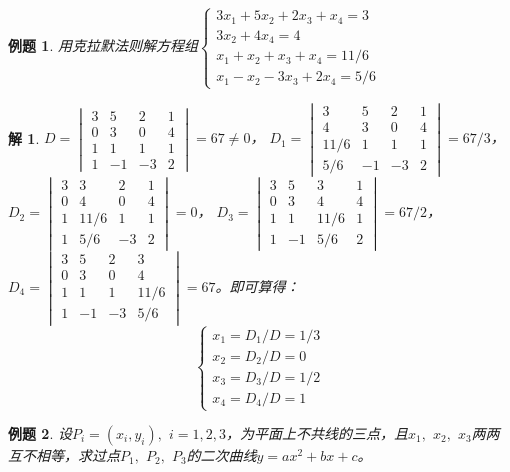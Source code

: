 \documentclass[a4paper]{book}
\newtheorem{eg}{例题}[chapter]
\newtheorem*{solution}{解}
\begin{document}
\begin{eg}
用克拉默法则解方程组$\begin{cases}
3x_1 + 5x_2 + 2x_3 + x_4 = 3 \\
3x_2 + 4x_4 = 4 \\
x_1 + x_2 + x_3 + x_4 = 11/6 \\
x_1 - x_2 - 3x_3 + 2x_4 = 5/6
\end{cases}$
\end{eg}

\begin{solution}
$D = \begin{vmatrix} 3 & 5 & 2 & 1 \\ 0 & 3 & 0 & 4 \\ 1 & 1 & 1 & 1 \\ 1 & -1 & -3 & 2 \end{vmatrix} = 67 \neq 0$，
$D_1 = \begin{vmatrix} 3 & 5 & 2 & 1 \\ 4 & 3 & 0 & 4 \\ 11/6 & 1 & 1 & 1 \\ 5/6 & -1 & -3 & 2 \end{vmatrix} = 67/3$，
$D_2 = \begin{vmatrix} 3 & 3 & 2 & 1 \\ 0 & 4 & 0 & 4 \\ 1 & 11/6 & 1 & 1 \\ 1 & 5/6 & -3 & 2 \end{vmatrix} = 0$，
$D_3 = \begin{vmatrix} 3 & 5 & 3 & 1 \\ 0 & 3 & 4 & 4 \\ 1 & 1 & 11/6 & 1 \\ 1 & -1 & 5/6 & 2 \end{vmatrix} = 67/2$，
$D_4 = \begin{vmatrix} 3 & 5 & 2 & 3 \\ 0 & 3 & 0 & 4 \\ 1 & 1 & 1 & 11/6 \\ 1 & -1 & -3 & 5/6 \end{vmatrix} =67$。即可算得：
$$
\begin{cases}
x_1 = D_1/D = 1/3 \\ x_2 = D_2/D = 0 \\ x_3 = D_3/D = 1/2 \\ x_4 = D_4/D = 1
\end{cases}$$
\end{solution}

\begin{eg}
设$P_i = (x_i ,y_i),$ $i=1, 2, 3$，为平面上不共线的三点，且$x_1,$ $x_2,$ $x_3$两两互不相等，求过点$P_1,$ $P_2,$ $P_3$的二次曲线$y = ax^2+bx+c$。
\end{eg}
\end{document}
